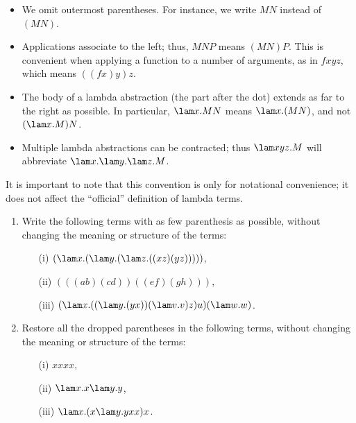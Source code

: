 \documentclass[12pt]{article}
\begin{document}
\begin{convention}
  \begin{itemize}
  \item We omit outermost parentheses. For instance, we write $MN$
    instead of $(MN)$.
  \item Applications associate to the left; thus, $MNP$ means
    $(MN)P$. This is convenient when applying a function to a number
    of arguments, as in $fxyz$, which means $((fx)y)z$. 
  \item The body of a lambda abstraction (the part after the dot)
    extends as far to the right as possible. In particular, $\lam
    x.MN$ means $\lam x.(MN)$, and not $(\lam x.M)N$. 
  \item Multiple lambda abstractions can be contracted; thus $\lam
    xyz.M$ will abbreviate $\lam x.\lam y.\lam z.M$.
  \end{itemize}
\end{convention}  

It is important to note that this convention is only for notational
convenience; it does not affect the ``official'' definition of lambda
terms.

\begin{exercise}
  \begin{enumerate}\alphalabels
  \item Write the following terms with as few parenthesis as possible,
    without changing the meaning or structure of the terms: 
    \begin{enumerate}
    \item[(i)] $(\lam x.(\lam y.(\lam z.((xz)(yz)))))$, 
    \item[(ii)] $(((ab)(cd))((ef)(gh)))$, 
    \item[(iii)] $(\lam x.((\lam y.(yx))(\lam v.v)z)u)(\lam w.w)$.
    \end{enumerate}
  \item Restore all the dropped parentheses in the following terms,
    without changing the meaning or structure of the terms: 
    \begin{enumerate}
    \item[(i)] $xxxx$, 
    \item[(ii)] $\lam x.x\lam y.y$, 
    \item[(iii)] $\lam x.(x\lam y.yxx)x$.
    \end{enumerate}
  \end{enumerate}
\end{exercise}

\end{document}
